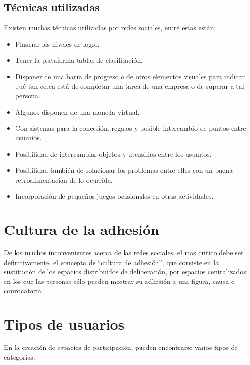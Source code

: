 \subsection{Técnicas utilizadas}

Existen muchas técnicas utilizadas por redes sociales, entre estas están:

\begin{itemize}
\item Plasmar los niveles de logro.
\item Tener la plataforma tablas de clasificación.
\item Disponer de una barra de progreso o de otros elementos visuales para
      indicar qué tan cerca está de completar una tarea de una empresa o de
      superar a tal persona.
\item Algunos disponen de una moneda virtual.
\item Con sistemas para la concesión, regalos y posible intercambio de puntos
      entre usuarios.
\item Posibilidad de intercambiar objetos y utensilios entre los usuarios.
\item Posibilidad también de solucionar los problemas entre ellos con un buena
      retroalimentación de lo ocurrido.
\item Incorporación de pequeños juegos ocasionales en otras actividades.
\end{itemize}

\section{Cultura de la adhesión}

De los muchos inconvenientes acerca de las redes sociales, el mas critico debe
ser definitivamente, el concepto de “cultura de adhesión”, que consiste en la
sustitución de los espacios distribuidos de deliberación, por espacios
centralizados en los que las personas sólo pueden mostrar su adhesión a una
figura, causa o convocatoria\cite{LasIndias}.

\section{Tipos de usuarios}

En la creación de espacios de participación, pueden encontrarse varios tipos de
categorías\cite{Santamaria2}:

